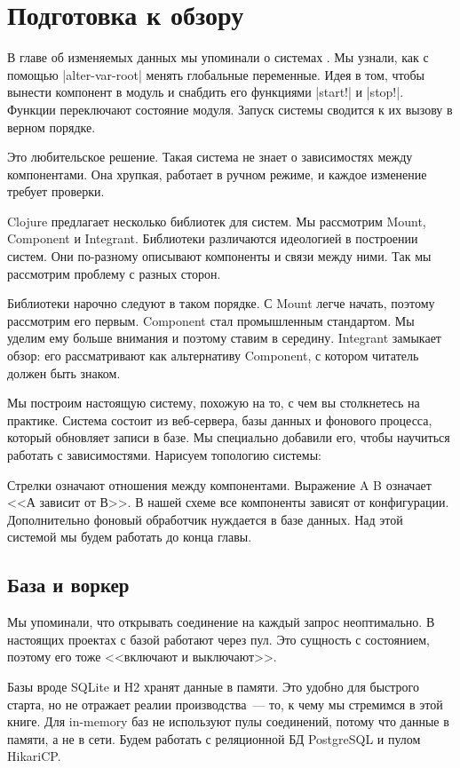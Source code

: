 \section{Подготовка к обзору}

В главе об изменяемых данных мы упоминали о системах . Мы
узнали, как с помощью \spverb|alter-var-root| менять глобальные переменные. Идея
в том, чтобы вынести компонент в модуль и снабдить его функциями \spverb|start!|
и \spverb|stop!|. Функции переключают состояние модуля. Запуск системы сводится
к их вызову в верном порядке.

Это любительское решение. Такая система не знает о зависимостях между
компонентами. Она хрупкая, работает в ручном режиме, и каждое изменение требует
проверки.

Clojure предлагает несколько библиотек для систем. Мы рассмотрим Mount,
Component и Integrant. Библиотеки различаются идеологией в построении
систем. Они по-разному описывают компоненты и связи между ними. Так мы
рассмотрим проблему с разных сторон.

Библиотеки нарочно следуют в таком порядке. С Mount легче начать, поэтому
рассмотрим его первым. Component стал промышленным стандартом. Мы уделим ему
больше внимания и поэтому ставим в середину. Integrant замыкает обзор: его
рассматривают как альтернативу Component, с котором читатель должен быть знаком.

Мы построим настоящую систему, похожую на то, с чем вы столкнетесь на
практике. Система состоит из веб-сервера, базы данных и фонового процесса,
который обновляет записи в базе. Мы специально добавили его, чтобы научиться
работать с зависимостями. Нарисуем топологию системы:


Стрелки означают отношения между компонентами. Выражение A \arr B означает
<<А зависит от В>>. В нашей схеме все компоненты зависят от конфигурации.
Дополнительно фоновый обработчик нуждается в базе данных. Над этой
системой мы будем работать до конца главы.

\subsection{База и воркер}

Мы упоминали, что открывать соединение на каждый запрос неоптимально. В
настоящих проектах с базой работают через пул. Это сущность с состоянием,
поэтому его тоже <<включают и выключают>>.

Базы вроде SQLite и H2 хранят данные в памяти. Это удобно для быстрого старта,
но не отражает реалии производства~--- то, к чему мы стремимся в этой книге. Для
in-memory баз не используют пулы соединений, потому что данные в памяти, а не в
сети. Будем работать с реляционной БД PostgreSQL и пулом HikariCP.

